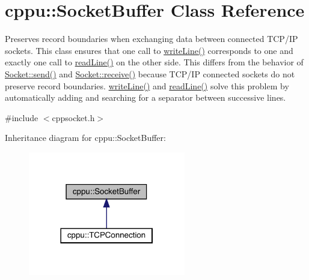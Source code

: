 \hypertarget{classcppu_1_1_socket_buffer}{}\section{cppu\+::Socket\+Buffer Class Reference}
\label{classcppu_1_1_socket_buffer}


Preserves record boundaries when exchanging data between connected T\+C\+P/\+IP sockets. This class ensures that one call to \mbox{\hyperlink{classcppu_1_1_socket_buffer_a92ae0351aaee8719d34e8c4618495d59}{write\+Line()}} corresponds to one and exactly one call to \mbox{\hyperlink{classcppu_1_1_socket_buffer_a222769d3776b9cbd3a727ee1f0e60358}{read\+Line()}} on the other side. This differs from the behavior of \mbox{\hyperlink{classcppu_1_1_socket_aeac77f859159715e2d63a5a0dc118788}{Socket\+::send()}} and \mbox{\hyperlink{classcppu_1_1_socket_a37c382af52cc02f92c0e19a0c6e0e04f}{Socket\+::receive()}} because T\+C\+P/\+IP connected sockets do not preserve record boundaries. \mbox{\hyperlink{classcppu_1_1_socket_buffer_a92ae0351aaee8719d34e8c4618495d59}{write\+Line()}} and \mbox{\hyperlink{classcppu_1_1_socket_buffer_a222769d3776b9cbd3a727ee1f0e60358}{read\+Line()}} solve this problem by automatically adding and searching for a separator between successive lines.  




{\ttfamily \#include $<$cppsocket.\+h$>$}



Inheritance diagram for cppu\+::Socket\+Buffer\+:
\nopagebreak
\begin{figure}[H]
\begin{center}
\leavevmode
\includegraphics[width=194pt]{classcppu_1_1_socket_buffer__inherit__graph}
\end{center}
\end{figure}


